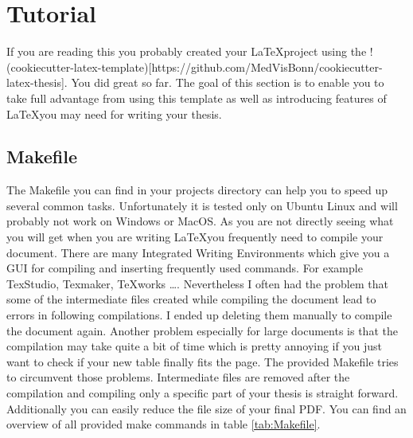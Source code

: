 \documentclass[{{cookiecutter.project_slug}}.tex]{subfiles}
\begin{document}
\chapter{Tutorial}

If you are reading this you probably created your \LaTeX project using the !(cookiecutter-latex-template)[https://github.com/MedVisBonn/cookiecutter-latex-thesis]. You did great so far. The goal of this section is to enable you to take full advantage from using this template as well as introducing features of \LaTeX you may need for writing your thesis.

\section{Makefile}
The Makefile you can find in your projects directory can help you to speed up several common tasks. Unfortunately it is tested only on Ubuntu Linux and will probably not work on Windows or MacOS. As you are not directly seeing what you will get when you are writing \LaTeX  you frequently need to compile your document. There are many Integrated Writing Environments which give you a GUI for compiling and inserting frequently used commands. For example TexStudio, Texmaker, TeXworks \dots. Nevertheless I often had the problem that some of the intermediate files created while compiling the document lead to errors in following compilations. I ended up deleting them manually to compile the document again. Another problem especially for large documents is that the compilation may take quite a bit of time which is pretty annoying if you just want to check if your new table finally fits the page. The provided Makefile tries to circumvent those problems. Intermediate files are removed after the compilation and compiling only a specific part of your thesis is straight forward. Additionally you can easily reduce the file size of your final PDF. You can find an overview of all provided make commands in table \ref{tab:Makefile}.
\end{document}
